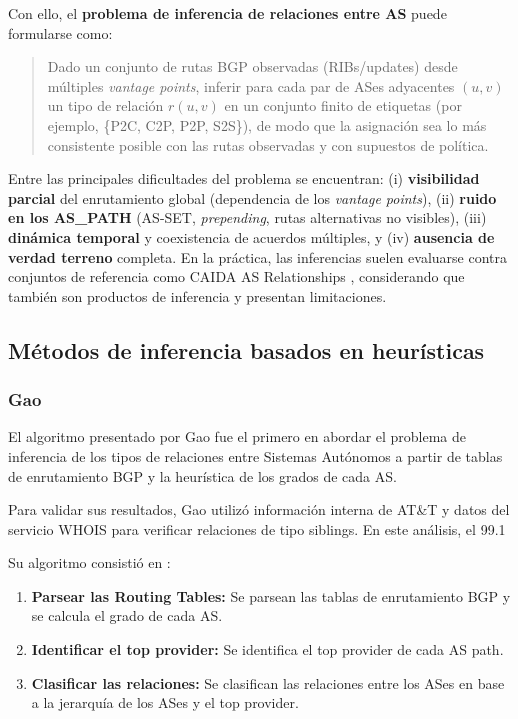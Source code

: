 Con ello, el \textbf{problema de inferencia de relaciones entre AS} puede formularse como:
\begin{quote}
    Dado un conjunto de rutas BGP observadas (RIBs/updates) desde múltiples \textit{vantage points}, inferir para cada par de ASes adyacentes $(u,v)$ un tipo de relación $r(u,v)$ en un conjunto finito de etiquetas (por ejemplo, \{P2C, C2P, P2P, S2S\}), de modo que la asignación sea lo más consistente posible con las rutas observadas y con supuestos de política.
\end{quote}

Entre las principales dificultades del problema se encuentran: (i) \textbf{visibilidad parcial} del enrutamiento global (dependencia de los \textit{vantage points}), (ii) \textbf{ruido en los AS\_PATH} (AS-SET, \textit{prepending}, rutas alternativas no visibles), (iii) \textbf{dinámica temporal} y coexistencia de acuerdos múltiples, y (iv) \textbf{ausencia de verdad terreno} completa. En la práctica, las inferencias suelen evaluarse contra conjuntos de referencia como CAIDA AS Relationships \cite{CAIDAS-relationship}, considerando que también son productos de inferencia y presentan limitaciones.





\subsection{Métodos de inferencia basados en heurísticas} \label{sec:anexo_inferencia_relaciones_as_heuristicas}

\subsubsection{Gao} \label{sec:anexo_gao}
El algoritmo presentado por Gao fue el primero en abordar el problema de inferencia de los tipos de relaciones entre Sistemas Autónomos a partir de tablas de enrutamiento BGP y la heurística de los grados de cada AS.

Para validar sus resultados, Gao utilizó información interna de AT\&T y datos del servicio WHOIS para verificar relaciones de tipo siblings. En este análisis, el 99.1%



Su algoritmo consistió en :
\begin{enumerate}
    \item \textbf{Parsear las Routing Tables:} Se parsean las tablas de enrutamiento BGP y se calcula el grado de cada AS.
    \item \textbf{Identificar el top provider:} Se identifica el top provider de cada AS path.
    \item \textbf{Clasificar las relaciones:} Se clasifican las relaciones entre los ASes en base a la jerarquía de los ASes y el top provider.
\end{enumerate}

